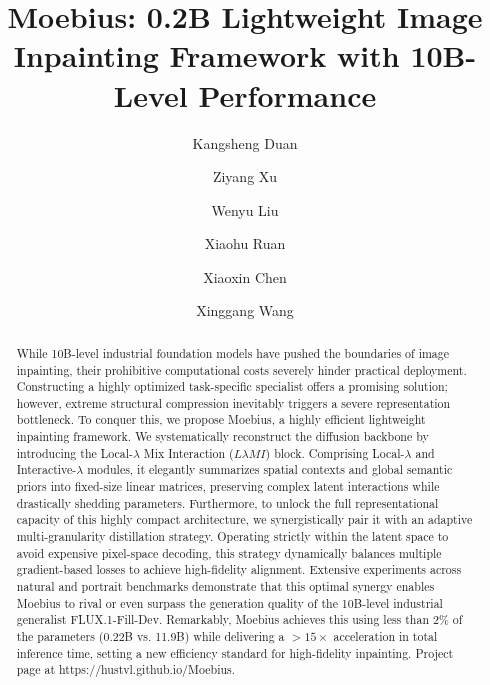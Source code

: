 \documentclass{llmxive}
\title{Moebius: 0.2B Lightweight Image Inpainting Framework with 10B-Level Performance}
\author{Kangsheng Duan \and Ziyang Xu \and Wenyu Liu \and Xiaohu Ruan \and Xiaoxin Chen \and Xinggang Wang}
\begin{document}
\maketitle
\begin{abstract}
While 10B-level industrial foundation models have pushed the boundaries of image inpainting, their prohibitive computational costs severely hinder practical deployment. Constructing a highly optimized task-specific specialist offers a promising solution; however, extreme structural compression inevitably triggers a severe representation bottleneck. To conquer this, we propose Moebius, a highly efficient lightweight inpainting framework. We systematically reconstruct the diffusion backbone by introducing the Local-$\lambda$ Mix Interaction ($L\lambda MI$) block. Comprising Local-$\lambda$ and Interactive-$\lambda$ modules, it elegantly summarizes spatial contexts and global semantic priors into fixed-size linear matrices, preserving complex latent interactions while drastically shedding parameters. Furthermore, to unlock the full representational capacity of this highly compact architecture, we synergistically pair it with an adaptive multi-granularity distillation strategy. Operating strictly within the latent space to avoid expensive pixel-space decoding, this strategy dynamically balances multiple gradient-based losses to achieve high-fidelity alignment. Extensive experiments across natural and portrait benchmarks demonstrate that this optimal synergy enables Moebius to rival or even surpass the generation quality of the 10B-level industrial generalist FLUX.1-Fill-Dev. Remarkably, Moebius achieves this using less than 2\% of the parameters (0.22B vs. 11.9B) while delivering a $>15\times$ acceleration in total inference time, setting a new efficiency standard for high-fidelity inpainting. Project page at https://hustvl.github.io/Moebius.
\end{abstract}
\end{document}
